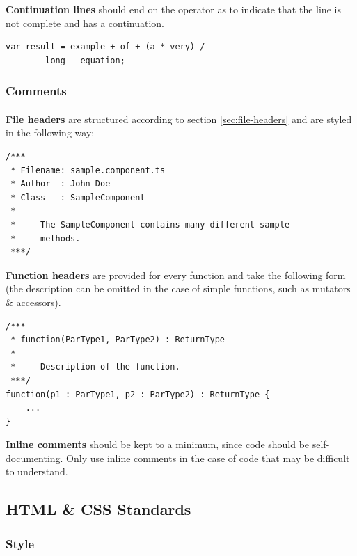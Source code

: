 \documentclass{article}
\begin{document}
    \textbf{Continuation lines} should end on the operator as to indicate that
    the line is not complete and has a continuation.

    \begin{lstlisting}
var result = example + of + (a * very) / 
        long - equation;
    \end{lstlisting}

    \subsubsection{Comments}
    \label{sec:typescript-com}

    \paragraph{}
    \textbf{File headers} are structured according to section
    \ref{sec:file-headers} and are styled in the following way:

    \begin{lstlisting}
/***
 * Filename: sample.component.ts
 * Author  : John Doe
 * Class   : SampleComponent
 *
 *     The SampleComponent contains many different sample
 *     methods.
 ***/
    \end{lstlisting}

    \textbf{Function headers} are provided for every function and take the
    following form (the description can be omitted in the case of simple
    functions, such as mutators \& accessors).

    \begin{lstlisting}
/***
 * function(ParType1, ParType2) : ReturnType
 *
 *     Description of the function.
 ***/
function(p1 : ParType1, p2 : ParType2) : ReturnType {
    ...
}
    \end{lstlisting}

    \textbf{Inline comments} should be kept to a minimum, since code should be
    self-documenting. Only use inline comments in the case of code that may be
    difficult to understand.

    \subsection{HTML \& CSS Standards}
    \label{sec:html-css}

    \subsubsection{Style}
    \label{sec:ls-html-st}
\end{document}
